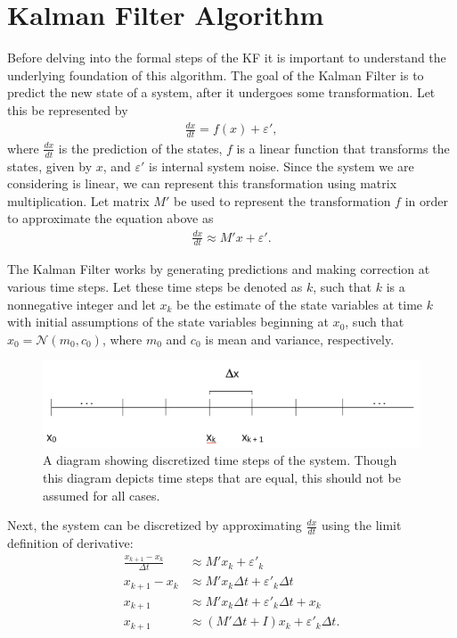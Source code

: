 \newpage

\section{Kalman Filter Algorithm}

Before delving into the formal steps of the KF it is important to understand the underlying foundation of this algorithm. The goal of the Kalman Filter is to predict the new state of a system, after it undergoes some transformation. Let this be represented by 
\begin{align*}
	\frac{dx}{dt} = f(x) + \varepsilon ',
\end{align*}
where $\frac{dx}{dt}$ is the prediction of the states, $f$ is a linear function that transforms the states, given by $x$, and $ \varepsilon '$ is internal system noise. Since the system we are considering is linear, we can represent this transformation using matrix multiplication. Let matrix $M'$ be used to represent the transformation $f$ in order to approximate the equation above as
\begin{align*}
	\frac{dx}{dt} \approx M'x + \varepsilon '.
\end{align*}

\noindent The Kalman Filter works by generating predictions and making correction at various time steps. Let these time steps be denoted as $k$, such that $ k $ is a nonnegative integer and let $x_k$ be the estimate of the state variables at time $k$ with initial assumptions of the state variables beginning at $x_0$, such that $x_0 = \mathcal{N}(m_0, c_0)$, where $m_0$ and $c_0$ is mean and variance, respectively. 

\begin{figure}[h]
    \centering
    \includegraphics[scale = 0.3]{kgraph.png}
    \caption{A diagram showing discretized time steps of the system. Though this diagram depicts time steps that are equal, this should not be assumed for all cases.}
\end{figure}

\noindent Next, the system can be discretized by approximating $\frac{dx}{dt}$ using the limit definition of derivative:
\begin{align*}
	\frac{x_{k+1} - x_k}{\Delta t} &\approx M'x_k + \varepsilon '_k \\
	x_{k+1} - x_k &\approx M'x_k \Delta t + \varepsilon '_k  \Delta t \\
	x_{k+1} &\approx M'x_k \Delta t + \varepsilon '_k  \Delta t + x_k \\
	x_{k+1} &\approx (M' \Delta t + I)x_k + \varepsilon '_k  \Delta t.
\end{align*}


